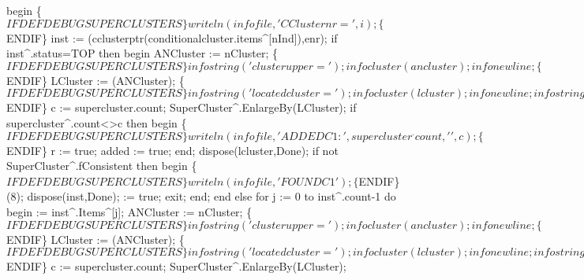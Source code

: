          begin
            \{$IFDEF DEBUGSUPERCLUSTERS\}
            writeln(infofile,'CClusternr=',i);
            \{$ENDIF\}
            inst := (cclusterptr(conditionalcluster.items^[nInd]),enr);
            if inst^.status=TOP then
            begin
               ANCluster := nCluster;
               \{$IFDEF DEBUGSUPERCLUSTERS\}
               infostring('clusterupper=');infocluster(ancluster);infonewline;
               \{$ENDIF\}
               LCluster := (ANCluster);
               \{$IFDEF DEBUGSUPERCLUSTERS\}
               infostring('locatedcluster=');infocluster(lcluster);infonewline;
               infostring('supercluster=');infocluster(supercluster);infonewline;
               \{$ENDIF\}
               c := supercluster.count;
               SuperCluster^.EnlargeBy(LCluster);
               if supercluster^.count<>c then
               begin
                  \{$IFDEF DEBUGSUPERCLUSTERS\}
                  writeln(infofile,'ADDEDC1:',supercluster^.count,' ',c);
                  \{$ENDIF\}
                  r := true;
                  added := true;
               end;
               dispose(lcluster,Done);
               if not SuperCluster^.fConsistent then
               begin
                  \{$IFDEF DEBUGSUPERCLUSTERS\}
                  writeln(infofile,'FOUNDC1');
                  \{$ENDIF\}
                  (8);
                  dispose(inst,Done);
                   := true;
                  exit;
               end;
            end
            else
               for j := 0 to inst^.count-1 do
               begin
                   := inst^.Items^[j];
                  ANCluster := nCluster;
                  \{$IFDEF DEBUGSUPERCLUSTERS\}
                  infostring('clusterupper=');
                  infocluster(ancluster);
                  infonewline;
                  \{$ENDIF\}
                  LCluster := (ANCluster);
                  \{$IFDEF DEBUGSUPERCLUSTERS\}
                  infostring('locatedcluster=');
                  infocluster(lcluster);
                  infonewline;
                  infostring('supercluster=');
                  infocluster(supercluster);
                  infonewline;
                  \{$ENDIF\}
                  c := supercluster.count;
                  SuperCluster^.EnlargeBy(LCluster);

